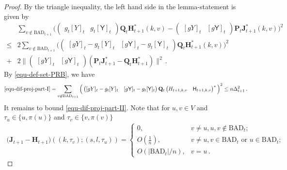 \documentclass[11pt]{article}
\numberwithin{equation}{section}
\begin{document}
\begin{proof}
By the triangle inequality, the left hand side in the lemma-statement is given by
\begin{align}
    &\sum_{v \not \in \mathrm{BAD}_{t+1}} \Big( \begin{pmatrix} g_t [Y]_t & g_t[\mathsf{Y}]_t \end{pmatrix} \mathbf{Q}_t \mathbf{H}_{t+1}^{*} (k,v) - \begin{pmatrix} [g Y]_t & [g \mathsf{Y}]_t \end{pmatrix} \mathbf{P}_t \mathbf{J}_{t+1}^{*} (k,v) \Big)^2 \nonumber\\
\leq
    & 2 \sum_{v \not \in \mathrm{BAD}_{t+1}} \Big( \begin{pmatrix}
        [g Y]_{t} - g_t [Y]_t & [ g\mathsf{Y} ]_{t} - g_t[\mathsf{Y}]_t
    \end{pmatrix} \mathbf{Q}_t \mathbf{H}_{t+1}^{*} (k,v) \Big)^2 \label{equ-dif-proj-part-I} \\
    + & 2 \big\| \begin{pmatrix}
        [g Y]_t & [g \mathsf{Y}]_t
    \end{pmatrix} (\mathbf{P}_t \mathbf{J}_{t+1}^{*} - \mathbf{Q}_t \mathbf{H}_{t+1}^{*} ) \big\|^2 \,. \label{equ-dif-proj-part-II}
\end{align}
By \eqref{equ-def-set-PRB}, we have 
\begin{align*}
\eqref{equ-dif-proj-part-I} =     \sum_{v \not \in \mathrm{BAD}_{t+1}}  \Big( \begin{pmatrix}
        [g Y]_{t} - g_t [Y]_t & [ g\mathsf{Y} ]_{t} - g_t[\mathsf{Y}]_t
    \end{pmatrix} \mathbf{Q}_t 
    \begin{pmatrix}
        H_{t+1,k,v} & \mathsf{H}_{t+1,k,v}
    \end{pmatrix}^{*} \Big)^2 \leq n \Delta_{t+1}^2\,.
\end{align*}
It remains to bound \eqref{equ-dif-proj-part-II}. Note that for $u, v\in V$ and $\tau_u \in \{u, \pi(u)\}$ and $\tau_v \in \{v, \pi(v)\}$
\begin{align*}
    \big( \mathbf{J}_{t+1} - \mathbf{H}_{t+1} \big) ((k,\tau_v);(s,l, \tau_u)) =
    \begin{cases}
    0 , & v \neq u, u,v \not \in \mathrm{BAD}_t ; \\
    O(\frac{1}{n}), & v \neq u, v \in \mathrm{BAD}_t \mbox{ or } u \in \mathrm{BAD}_t ; \\
    O(|\mathrm{BAD}_t|/n), &v=u \,.
    \end{cases}

\end{align*}
\end{proof}
\end{document}
